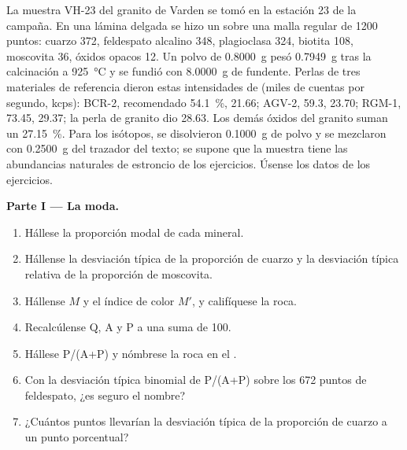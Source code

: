\begin{problem}\label{pb:b2:field-lab-methods-2:1}
La muestra VH-23 del granito de Varden se tomó en la estación 23 de la campaña. En una lámina delgada se hizo un
 sobre una malla regular de 1200 puntos: cuarzo 372, feldespato alcalino 348, plagioclasa 324,
biotita 108, moscovita 36, óxidos opacos 12. Un polvo de \qty{0.8000}{g} pesó \qty{0.7949}{g}
tras la calcinación a \qty{925}{\celsius} y se fundió con \qty{8.0000}{g} de fundente. Perlas de tres
materiales de referencia dieron estas intensidades de  (miles de cuentas por segundo, kcps): BCR-2,
recomendado \qty{54.1}{\percent}, 21.66; AGV-2, 59.3, 23.70; RGM-1, 73.45, 29.37; la perla de granito
dio 28.63. Los demás óxidos del granito suman un \qty{27.15}{\percent}. Para los isótopos,
se disolvieron \qty{0.1000}{g} de polvo y se mezclaron con \qty{0.2500}{g} del trazador del texto;
se supone que la muestra tiene las abundancias naturales de estroncio de los ejercicios. Úsense los datos de los
ejercicios.

\noindent\textbf{Parte I --- La moda.}
\begin{enumerate}
  \item Hállese la proporción modal de cada mineral.
  \item Hállense la desviación típica de la proporción de cuarzo y la desviación típica relativa
        de la proporción de moscovita.
  \item Hállense $M$ y el índice de color $M'$, y califíquese la roca.
  \item Recalcúlense Q, A y P a una suma de 100.
  \item Hállese P/(A+P) y nómbrese la roca en el .
  \item Con la desviación típica binomial de P/(A+P) sobre los 672 puntos de feldespato, ¿es seguro
        el nombre?
  \item ¿Cuántos puntos llevarían la desviación típica de la proporción de cuarzo a un punto
        porcentual?
\end{enumerate}


\end{problem}
